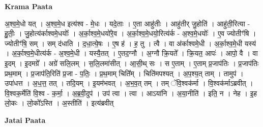 \documentclass[17pt]{extarticle}
\begin{document}
\textbf{Krama Paata} \newline

अ॒श्व॒मे॒धो यत् । अ॒श्व॒मे॒ध इत्य॑श्व - मे॒धः । यदे॒ताः । ए॒ता आहु॑तीः । आहु॑तीर् जु॒होति॑ । आहु॑ती॒रित्या - हु॒तीः॒ । जु॒होत्य॑र्काश्वमे॒धयोः᳚ । अ॒र्का॒श्व॒मे॒धयो॑रे॒व । अ॒र्का॒श्व॒मे॒धयो॒रित्य॑र्क - अ॒श्व॒मे॒धयोः᳚ । ए॒व ज्योतीꣳ॑षि । ज्योतीꣳ॑षि॒ सम् । सम् द॑धाति । द॒धा॒त्ये॒षः । ए॒ष ह॑ । ह॒ तु । त्वै । वा अ॑र्काश्वमे॒धी । अ॒र्का॒श्व॒मे॒धी यस्य॑ । अ॒र्का॒श्व॒मे॒धीत्य॑र्क - अ॒श्व॒मे॒धी । यस्यै॒तत् । ए॒तद॒ग्नौ । अ॒ग्नौ क्रि॒यते᳚ । क्रि॒यत॒ आपः॑ । आपो॒ वै । वा इ॒दम् । इ॒दमग्रे᳚ । अग्रे॑ सलि॒लम् । स॒लि॒लमा॑सीत् । आ॒सी॒थ् सः । स ए॒ताम् । ए॒ताम् प्र॒जाप॑तिः । प्र॒जाप॑तिः प्रथ॒माम् । प्र॒जाप॑ति॒रिति॑ प्र॒जा - प॒तिः॒ । प्र॒थ॒माम् चिति᳚म् । चिति॑मपश्यत् । अ॒प॒श्य॒त् ताम् । तामुप॑ । उपा॑धत्त । अ॒ध॒त्त॒ तत् । तदि॒यम् । इ॒यम॑भवत् । अ॒भ॒व॒त् तम् । तम् ॅवि॒श्वक॑र्मा । वि॒श्वक॑र्माऽब्रवीत् । वि॒श्वक॒र्मेति॑ वि॒श्व - क॒र्मा॒ । अ॒ब्र॒वी॒दुप॑ । उप॑ त्वा । त्वा । आऽया॑नि । अ॒या॒नीति॑ । इति॒ न । नेह । इ॒ह लो॒कः । लो॒को᳚ऽस्ति । अ॒स्तीति॑ । इत्य॑ब्रवीत् \newline

\textbf{Jatai Paata} \newline
\end{document}

